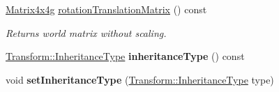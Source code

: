 \begin{Indent}
\begin{DoxyCompactItemize}
\mbox{\hyperlink{classrev_1_1_square_matrix}{Matrix4x4g}} \mbox{\hyperlink{classrev_1_1_transform_a6ee4c67ad1b8e16e56545abfab21dd59}{rotation\+Translation\+Matrix}} () const
\begin{DoxyCompactList}\small\item\em Returns world matrix without scaling. \end{DoxyCompactList}\item 
\mbox{\label{classrev_1_1_transform_acc4daac8e005c383f14a659f43407435}} 
\mbox{\hyperlink{classrev_1_1_transform_a0945b935b8f5fbf95920720ac8874e93}{Transform\+::\+Inheritance\+Type}} {\bfseries inheritance\+Type} () const
\item 
\mbox{\label{classrev_1_1_transform_a135dbf5a1e9ae57c86e5c8b9dd582056}} 
void {\bfseries set\+Inheritance\+Type} (\mbox{\hyperlink{classrev_1_1_transform_a0945b935b8f5fbf95920720ac8874e93}{Transform\+::\+Inheritance\+Type}} type)
\end{DoxyCompactItemize}
\end{Indent}
